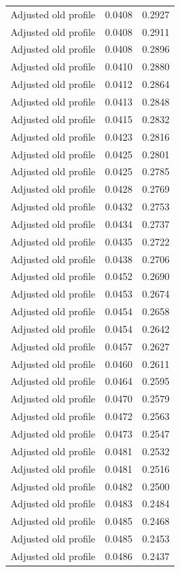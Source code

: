 \begin{table}[htbp]
\begin{tabular}{lll}
Adjusted old profile & 0.0408 & 0.2927 \\
Adjusted old profile & 0.0408 & 0.2911 \\
Adjusted old profile & 0.0408 & 0.2896 \\
Adjusted old profile & 0.0410 & 0.2880 \\
Adjusted old profile & 0.0412 & 0.2864 \\
Adjusted old profile & 0.0413 & 0.2848 \\
Adjusted old profile & 0.0415 & 0.2832 \\
Adjusted old profile & 0.0423 & 0.2816 \\
Adjusted old profile & 0.0425 & 0.2801 \\
Adjusted old profile & 0.0425 & 0.2785 \\
Adjusted old profile & 0.0428 & 0.2769 \\
Adjusted old profile & 0.0432 & 0.2753 \\
Adjusted old profile & 0.0434 & 0.2737 \\
Adjusted old profile & 0.0435 & 0.2722 \\
Adjusted old profile & 0.0438 & 0.2706 \\
Adjusted old profile & 0.0452 & 0.2690 \\
Adjusted old profile & 0.0453 & 0.2674 \\
Adjusted old profile & 0.0454 & 0.2658 \\
Adjusted old profile & 0.0454 & 0.2642 \\
Adjusted old profile & 0.0457 & 0.2627 \\
Adjusted old profile & 0.0460 & 0.2611 \\
Adjusted old profile & 0.0464 & 0.2595 \\
Adjusted old profile & 0.0470 & 0.2579 \\
Adjusted old profile & 0.0472 & 0.2563 \\
Adjusted old profile & 0.0473 & 0.2547 \\
Adjusted old profile & 0.0481 & 0.2532 \\
Adjusted old profile & 0.0481 & 0.2516 \\
Adjusted old profile & 0.0482 & 0.2500 \\
Adjusted old profile & 0.0483 & 0.2484 \\
Adjusted old profile & 0.0485 & 0.2468 \\
Adjusted old profile & 0.0485 & 0.2453 \\
Adjusted old profile & 0.0486 & 0.2437 \\

\end{tabular}
\end{table}

